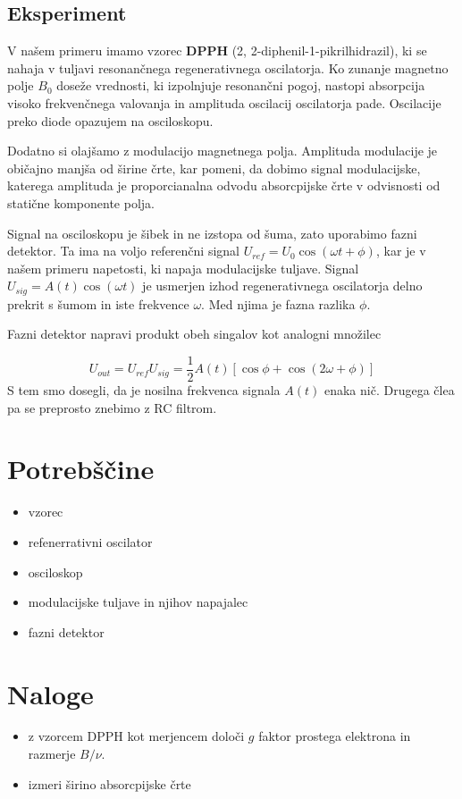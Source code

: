 \documentclass[11pt]{article}
\begin{document}
\subsection{Eksperiment}\label{sec:org7199d4b}

V našem primeru imamo vzorec \textbf{DPPH} (2, 2-diphenil-1-pikrilhidrazil), ki se nahaja v tuljavi resonančnega regenerativnega oscilatorja. Ko zunanje magnetno polje \(B_0\) doseže vrednosti, ki izpolnjuje resonančni pogoj, nastopi absorpcija visoko frekvenčnega valovanja in amplituda oscilacij oscilatorja pade. Oscilacije preko diode opazujem na osciloskopu.

Dodatno si olajšamo z modulacijo magnetnega polja. Amplituda modulacije je običajno manjša od širine črte, kar pomeni, da dobimo signal modulacijske, katerega amplituda je proporcianalna odvodu absorcpijske črte v odvisnosti od statične komponente polja.

Signal na osciloskopu je šibek in ne izstopa od šuma, zato uporabimo fazni detektor. Ta ima na voljo referenčni signal \(U_{ref} = U_0 \cos (\omega t + \phi)\), kar je v našem primeru napetosti, ki napaja modulacijske tuljave. Signal \(U_{sig} = A(t) \cos (\omega t)\) je usmerjen izhod regenerativnega oscilatorja delno prekrit s šumom in iste frekvence \(\omega\). Med njima je fazna razlika \(\phi\).

Fazni detektor napravi produkt obeh singalov kot analogni množilec

\[ U_{out} = U_{ref} U_{sig} = \frac{1}{2} A(t) \left[ \cos \phi + \cos (2\omega + \phi) \right]
\]
S tem smo dosegli, da je nosilna frekvenca signala \(A(t)\) enaka nič. Drugega člea pa se preprosto znebimo z RC filtrom.

\section{Potrebščine}\label{sec:org6464457}
\begin{itemize}
\item vzorec
\item refenerrativni oscilator
\item osciloskop
\item modulacijske tuljave in njihov napajalec
\item fazni detektor
\end{itemize}

\section{Naloge}\label{sec:org74240be}
\begin{itemize}
\item z vzorcem DPPH kot merjencem določi \(g\) faktor prostega elektrona in razmerje \(B/ \nu\).
\item izmeri širino absorcpijske črte
\end{itemize}
\end{document}
